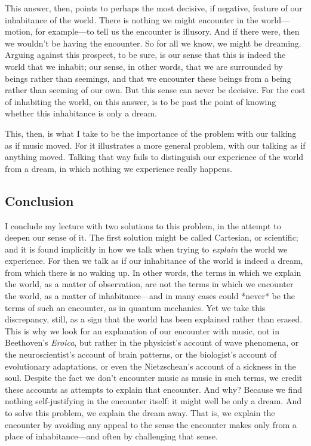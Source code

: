 \documentclass[12pt]{memoir}
\begin{document}
This answer, then, points to perhaps the most decisive, if negative,
feature of our inhabitance of the world. There is nothing we might
encounter in the world---motion, for example---to tell us the encounter
is illusory. And if there were, then we wouldn't be having the
encounter. So for all we know, we might be dreaming. Arguing against
this prospect, to be sure, is our sense that this is indeed the world
that we inhabit; our sense, in other words, that we are surrounded by
beings rather than seemings, and that we encounter these beings from a
being rather than seeming of our own. But this sense can never be
decisive. For the cost of inhabiting the world, on this answer, is to be
past the point of knowing whether this inhabitance is only a dream.

This, then, is what I take to be the importance of the problem with our
talking as if music moved. For it illustrates a more general problem,
with our talking as if anything moved. Talking that way fails to
distinguish our experience of the world from a dream, in which nothing
we experience really happens.

\subsection{Conclusion}

I conclude my lecture with two solutions to this
problem, in the attempt to deepen our sense of it.
The first solution might be called Cartesian, or
scientific; and it is found implicitly in how we talk
when trying to \emph{explain} the world we experience.
For then we talk as if our inhabitance
of the world is indeed a dream, from which there
is no waking up. In other words, the terms in which we explain the world, as a
matter of observation, are not the terms in which
we encounter the world, as a matter of
inhabitance---and in many cases could *never* be
the terms of such an encounter, as in quantum
mechanics. Yet we take this discrepancy, still,
as a sign that the world has been explained
rather than erased. This is why we look for an
explanation of our encounter with music, not in
Beethoven's \emph{Eroica}, but rather in the
physicist's account of wave phenomena, or the
neuroscientist's account of brain patterns, or the
biologist's account of evolutionary adaptations,
or even the Nietzschean's account of a sickness
in the soul. Despite the fact we don't encounter
music as music in such terms, we credit these
accounts as attempts to explain that encounter.
And why? Because we find nothing self-justifying
in the encounter itself: it might well be only a
dream. And to solve this problem, we explain the
dream away. That is, we explain the encounter by
avoiding any appeal to the sense the encounter
makes only from a place of inhabitance---and often
by challenging that sense.
\end{document}
